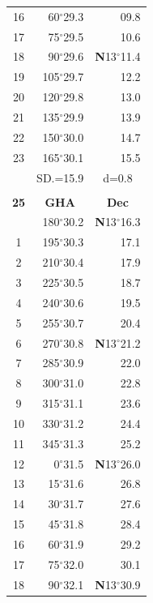\documentclass[10pt, a4paper]{report}
\begin{document}
\begin{scriptsize}
\begin{tabular*}{0.2\textwidth}[t]{@{\extracolsep{\fill}}|c|rr|}
16 & 60$^\circ$29.3 & 09.8\\
17 & 75$^\circ$29.5 & 10.6\\[2Pt]
18 & 90$^\circ$29.6 & \textbf{N}13$^\circ$11.4\\
19 & 105$^\circ$29.7 & 12.2\\
20 & 120$^\circ$29.8 & 13.0\\
21 & 135$^\circ$29.9 & \raisebox{0.24ex}{\boldmath$\cdot$~\boldmath$\cdot$~~}13.9\\
22 & 150$^\circ$30.0 & 14.7\\
23 & 165$^\circ$30.1 & 15.5\\
\hline
\rule{0pt}{2.4ex} & \multicolumn{1}{c}{SD.=15.9} & \multicolumn{1}{c|}{d=0.8}\\
\hline
\multicolumn{1}{c}{}\\[-0.5ex]\hline
\multicolumn{1}{|c|}{\rule{0pt}{2.6ex}\textbf{25}} & \multicolumn{1}{c}{\textbf{GHA}} & \multicolumn{1}{c|}{\textbf{Dec}}\\
\hline\rule{0pt}{2.6ex}\noindent
0 & 180$^\circ$30.2 & \textbf{N}13$^\circ$16.3\\
1 & 195$^\circ$30.3 & 17.1\\
2 & 210$^\circ$30.4 & 17.9\\
3 & 225$^\circ$30.5 & \raisebox{0.24ex}{\boldmath$\cdot$~\boldmath$\cdot$~~}18.7\\
4 & 240$^\circ$30.6 & 19.5\\
5 & 255$^\circ$30.7 & 20.4\\[2Pt]
6 & 270$^\circ$30.8 & \textbf{N}13$^\circ$21.2\\
7 & 285$^\circ$30.9 & 22.0\\
8 & 300$^\circ$31.0 & 22.8\\
9 & 315$^\circ$31.1 & \raisebox{0.24ex}{\boldmath$\cdot$~\boldmath$\cdot$~~}23.6\\
10 & 330$^\circ$31.2 & 24.4\\
11 & 345$^\circ$31.3 & 25.2\\[2Pt]
12 & 0$^\circ$31.5 & \textbf{N}13$^\circ$26.0\\
13 & 15$^\circ$31.6 & 26.8\\
14 & 30$^\circ$31.7 & 27.6\\
15 & 45$^\circ$31.8 & \raisebox{0.24ex}{\boldmath$\cdot$~\boldmath$\cdot$~~}28.4\\
16 & 60$^\circ$31.9 & 29.2\\
17 & 75$^\circ$32.0 & 30.1\\[2Pt]
18 & 90$^\circ$32.1 & \textbf{N}13$^\circ$30.9\\

\end{tabular*}
\end{scriptsize}
\end{document}
